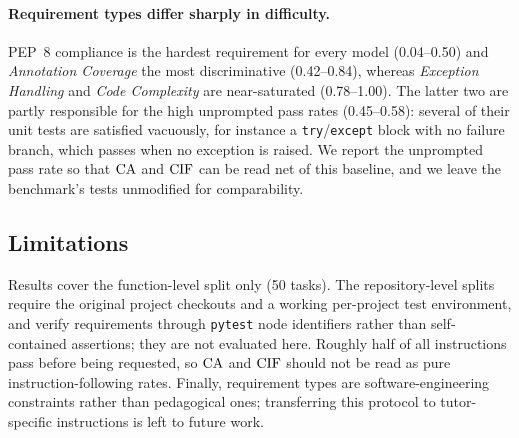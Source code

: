 \paragraph{Requirement types differ sharply in difficulty.}
PEP~8 compliance is the hardest requirement for every model (0.04--0.50) and
\emph{Annotation Coverage} the most discriminative (0.42--0.84), whereas
\emph{Exception Handling} and \emph{Code Complexity} are near-saturated
(0.78--1.00). The latter two are partly responsible for the high unprompted
pass rates (0.45--0.58): several of their unit tests are satisfied vacuously,
for instance a \texttt{try}/\texttt{except} block with no failure branch, which
passes when no exception is raised. We report the unprompted pass rate so that
$\mathrm{CA}$ and $\mathrm{CIF}$ can be read net of this baseline, and we leave the benchmark's
tests unmodified for comparability.

\subsection{Limitations}

Results cover the function-level split only (50 tasks). The repository-level
splits require the original project checkouts and a working per-project test
environment, and verify requirements through \texttt{pytest} node identifiers
rather than self-contained assertions; they are not evaluated here. Roughly
half of all instructions pass before being requested, so $\mathrm{CA}$ and $\mathrm{CIF}$ should
not be read as pure instruction-following rates. Finally, requirement types are
software-engineering constraints rather than pedagogical ones; transferring this
protocol to tutor-specific instructions is left to future work.
